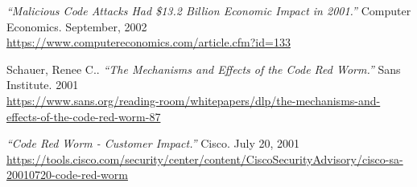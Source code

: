 \begin{thebibliography}{99}

\begin{comment}
\bibitem{kurose} James F.~Kurose \& Keith W. Ross:
\emph{Reti di calcolatori e internet. Un approccio top-down.}
Pearson (2013)
\end{comment}

\emph{``Malicious Code Attacks Had \$13.2 Billion Economic Impact in 2001.''}
Computer Economics. September, 2002\\
\url{https://www.computereconomics.com/article.cfm?id=133}

 Schauer, Renee C..
\emph{``The Mechanisms and Effects of the Code Red Worm.''}
Sans Institute. 2001\\
\url{https://www.sans.org/reading-room/whitepapers/dlp/the-mechanisms-and-effects-of-the-code-red-worm-87}

\emph{``Code Red Worm - Customer Impact.''}
Cisco. July 20, 2001\\
\url{https://tools.cisco.com/security/center/content/CiscoSecurityAdvisory/cisco-sa-20010720-code-red-worm}

\end{thebibliography}
